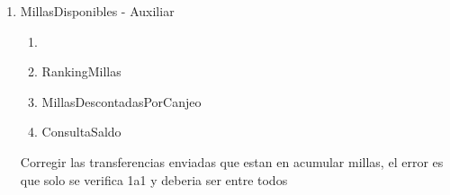 \documentclass[11pt,a4paper]{article}
\begin{document}
\begin{enumerate}
	      \begin{enumerate}
		      \item consultar si NoHayPermutacion esta escrito de forma correcta, yo creo que si
		      \item Cambie la implementacion de NoHayRepetidos que estaba mal por NoHayRepetidosV2 (revisar) \\
		      \item HayReciproco deberia tener un existencial? Creo que esto esta mal, en TieneReciprocoHistorial tomamos todas del historial, pero no me interesa que exista uno que cumpla la condicion, me interesa que todos cumplan la condicion...
		      \item consultar el tipado t0,t1 de SonParejaExclusiva
	      \end{enumerate}

	\item MillasDisponibles - Auxiliar
	      \begin{enumerate}
		      \item {}
		      \item RankingMillas
		      \item MillasDescontadasPorCanjeo
		      \item ConsultaSaldo
	      \end{enumerate}
	      Corregir las transferencias enviadas que estan en acumular millas, el error es que solo se verifica 1a1 y deberia ser entre todos 


\end{enumerate}
\end{document}
